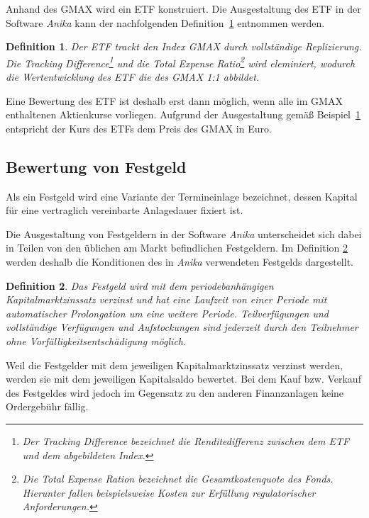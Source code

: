 \documentclass[12pt, a4paper]{article}
\theoremstyle{plain}
\newtheorem{definition}{Definition}
\begin{document}
 Anhand des \gls{GMAX} wird ein \gls{ETF} konstruiert. Die Ausgestaltung des \gls{ETF} in der Software \textit{Anika} kann der nachfolgenden Definition~\ref{def:etf} entnommen werden.
\begin{definition}
	\label{def:etf}
	Der \gls{ETF} trackt den Index \gls{GMAX} durch vollständige Replizierung. Die \textit{Tracking Difference}\footnote{Der \textit{Tracking Difference} bezeichnet die Renditedifferenz zwischen dem \gls{ETF} und dem abgebildeten Index.} und die \textit{Total Expense Ratio}\footnote{Die \textit{Total Expense Ration} bezeichnet die Gesamtkostenquote des Fonds. Hierunter fallen beispielsweise Kosten zur Erfüllung regulatorischer Anforderungen.} wird eleminiert, wodurch die Wertentwicklung des \gls{ETF} die des \gls{GMAX} 1:1 abbildet.
\end{definition}

Eine Bewertung des \gls{ETF} ist deshalb erst dann möglich, wenn alle im \gls{GMAX} enthaltenen Aktienkurse vorliegen. Aufgrund der Ausgestaltung gemäß Beispiel~\ref{def:etf} entspricht der Kurs des \glspl{ETF} dem Preis des \gls{GMAX} in Euro. 

\subsection{Bewertung von Festgeld}
\label{sec:bewertung_von_festgeldern}

Als ein Festgeld wird eine Variante der Termineinlage bezeichnet, dessen Kapital für eine vertraglich vereinbarte Anlagedauer fixiert ist.

Die Ausgestaltung von Festgeldern in der Software \textit{Anika} unterscheidet sich dabei in Teilen von den üblichen am Markt befindlichen Festgeldern. Im Definition \ref{def:festgeld} werden deshalb die Konditionen des in \textit{Anika} verwendeten Festgelds dargestellt.

\begin{definition}
	\label{def:festgeld}
	Das Festgeld wird mit dem periodebanhängigen Kapitalmarktzinssatz verzinst und hat eine Laufzeit von einer Periode mit automatischer Prolongation um eine weitere Periode. Teilverfügungen und vollständige Verfügungen und Aufstockungen sind jederzeit durch den Teilnehmer ohne Vorfälligkeitsentschädigung möglich. 
\end{definition}

Weil die Festgelder mit dem jeweiligen Kapitalmarktzinssatz verzinst werden, werden sie mit dem jeweiligen Kapitalsaldo bewertet. Bei dem Kauf bzw. Verkauf des Festgeldes wird jedoch im Gegensatz zu den anderen Finanzanlagen keine Ordergebühr fällig.
\end{document}

